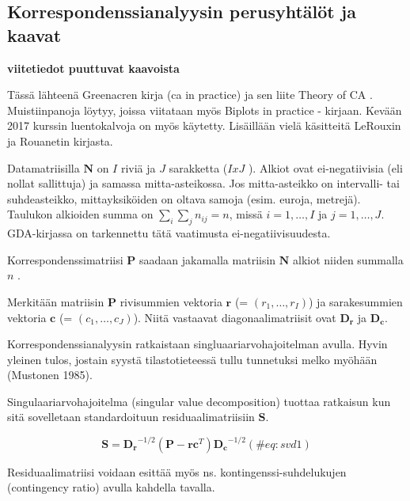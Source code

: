 \documentclass[
  finnish,
]{book}
\begin{document}
\hypertarget{korrespondenssianalyysin-perusyhtuxe4luxf6t-ja-kaavat}{%
\subsection{Korrespondenssianalyysin perusyhtälöt ja
kaavat}\label{korrespondenssianalyysin-perusyhtuxe4luxf6t-ja-kaavat}}

\textbf{viitetiedot puuttuvat kaavoista}

Tässä lähteenä Greenacren kirja (ca in practice) ja sen liite Theory of
CA . Muistiinpanoja löytyy, joissa viitataan myös Biplots in practice -
kirjaan. Kevään 2017 kurssin luentokalvoja on myös käytetty. Lisäillään
vielä käsitteitä LeRouxin ja Rouanetin kirjasta.

Datamatriisilla \(\boldsymbol{N}\) on \(I\) riviä ja \(J\) sarakketta
(\(I x J\) ). Alkiot ovat ei-negatiivisia (eli nollat sallittuja) ja
samassa mitta-asteikossa. Jos mitta-asteikko on intervalli- tai
suhdeasteikko, mittayksiköiden on oltava samoja (esim. euroja, metrejä).
Taulukon alkioiden summa on \(\sum_{i} \sum_{j}n_{ij} = n\), missä
\(i = 1, \dots , I\) ja \(j = 1, \dots , J\). GDA-kirjassa on
tarkennettu tätä vaatimusta ei-negatiivisuudesta.

Korrespondenssimatriisi \(\boldsymbol{P}\) saadaan jakamalla matriisin
\(\boldsymbol{N}\) alkiot niiden summalla \(n\) .

Merkitään matriisin \(\boldsymbol{P}\) rivisummien vektoria
\(\boldsymbol{r}\) (= \((r_{1}, \dots, r_{I})\)) ja sarakesummien
vektoria \(\boldsymbol{c}\) (= \((c_{1}, \dots, c_{J})\)). Niitä
vastaavat diagonaalimatriisit ovat \(\boldsymbol{D_r}\) ja
\(\boldsymbol{D_c}\).

Korrespondenssianalyysin ratkaistaan singluaariarvohajoitelman avulla.
Hyvin yleinen tulos, jostain syystä tilastotieteessä tullu tunnetuksi
melko myöhään (Mustonen 1985).

Singulaariarvohajoitelma (singular value decomposition) tuottaa
ratkaisun kun sitä sovelletaan standardoituun residuaalimatriisiin
\(\boldsymbol{S}\).

\begin{equation}
\boldsymbol{S} = \boldsymbol{D_r}^{-1/2}(\boldsymbol{P} - \boldsymbol{r}\boldsymbol{c}^T)\boldsymbol{D_c}^{-1/2} \label{A}
(\#eq:svd1)
\end{equation}

Residuaalimatriisi voidaan esittää myös ns. kontingenssi-suhdelukujen
(contingency ratio) avulla kahdella tavalla.
\end{document}
